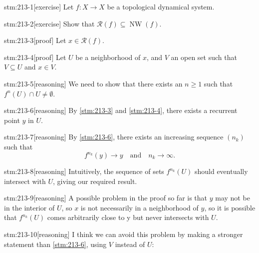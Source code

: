 
\begin{stm}{stm:213-1}[exercise]
Let $f : X \to X$ be a topological dynamical system.
\end{stm}

\begin{stm}{stm:213-2}[exercise]
Show that $\mathcal{R}(f) \subseteq \operatorname{NW}(f)$.
\end{stm}


\begin{stm}{stm:213-3}[proof]
Let $x \in \mathcal{R}(f)$. 
\end{stm}

\begin{stm}{stm:213-4}[proof]
Let $U$ be a neighborhood of $x$, and $V$ an open set such that $V \subseteq U$ and $x \in V$.
\end{stm}

\begin{stm}{stm:213-5}[reasoning]
We need to show that there exists an $n \geq 1$ such that $f^n(U) \cap U \neq \emptyset$.
\end{stm}

\begin{stm}{stm:213-6}[reasoning]
By \ref{stm:213-3} and \ref{stm:213-4}, there exists a recurrent point $y$ in $U$.
\end{stm}

\begin{stm}{stm:213-7}[reasoning]
By \ref{stm:213-6}, there exists an increasing sequence $(n_k)$ such that 
\[
f^{n_k}(y) \to y \quad \text{and} \quad n_k \to \infty.
\]
\end{stm}

\begin{stm}{stm:213-8}[reasoning]
Intuitively, the sequence of sets $f^{n_k}(U)$ should eventually intersect with $U$, giving our required result.
\end{stm}

\begin{stm}{stm:213-9}[reasoning]
A possible problem in the proof so far is that $y$ may not be in the interior of $U$, so $x$ is not necessarily in a neighborhood of $y$, so it is possible that $f^{n_k}(U)$ comes arbitrarily close to y but never intersects with $U$.
\end{stm}

\begin{stm}{stm:213-10}[reasoning]
I think we can avoid this problem by making a stronger statement than \ref{stm:213-6}, using $V$ instead of $U$:
\end{stm}

